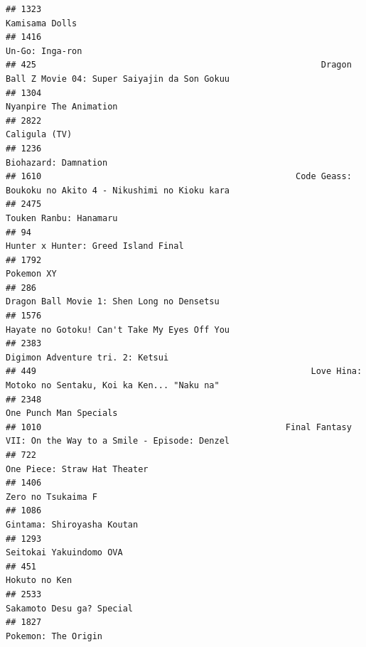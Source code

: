 \documentclass[
]{article}
\begin{document}
\begin{verbatim}
## 1323                                                                                            Kamisama Dolls
## 1416                                                                                           Un-Go: Inga-ron
## 425                                                        Dragon Ball Z Movie 04: Super Saiyajin da Son Gokuu
## 1304                                                                                    Nyanpire The Animation
## 2822                                                                                             Caligula (TV)
## 1236                                                                                      Biohazard: Damnation
## 1610                                                  Code Geass: Boukoku no Akito 4 - Nikushimi no Kioku kara
## 2475                                                                                    Touken Ranbu: Hanamaru
## 94                                                                         Hunter x Hunter: Greed Island Final
## 1792                                                                                                Pokemon XY
## 286                                                                 Dragon Ball Movie 1: Shen Long no Densetsu
## 1576                                                              Hayate no Gotoku! Can't Take My Eyes Off You
## 2383                                                                          Digimon Adventure tri. 2: Ketsui
## 449                                                      Love Hina: Motoko no Sentaku, Koi ka Ken... "Naku na"
## 2348                                                                                    One Punch Man Specials
## 1010                                                Final Fantasy VII: On the Way to a Smile - Episode: Denzel
## 722                                                                               One Piece: Straw Hat Theater
## 1406                                                                                        Zero no Tsukaima F
## 1086                                                                                Gintama: Shiroyasha Koutan
## 1293                                                                                   Seitokai Yakuindomo OVA
## 451                                                                                              Hokuto no Ken
## 2533                                                                                 Sakamoto Desu ga? Special
## 1827                                                                                       Pokemon: The Origin

\end{verbatim}
\end{document}
